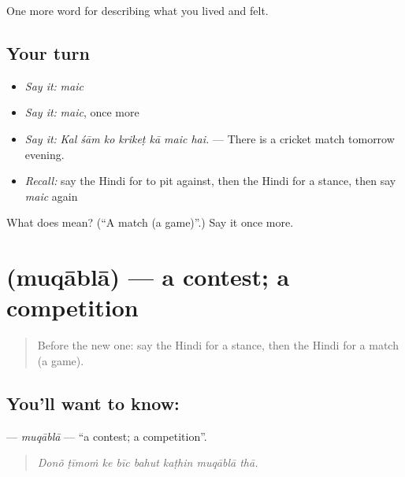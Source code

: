 \begin{grammarlens}[title={What you've built}]
One more word for describing what you lived and felt.
\end{grammarlens}

\subsection*{Your turn}
\begin{itemize}
\raggedright
  \item \emph{Say it:} \emph{maic}
  \item \emph{Say it:} \emph{maic}, once more
  \item \emph{Say it:} \emph{Kal śām ko krikeṭ kā maic hai.} — There is a cricket match tomorrow evening.
  \item \emph{Recall:} say the Hindi for to pit against, then the Hindi for a stance, then say \emph{maic} again
\end{itemize}

\begin{tcolorbox}[breakable,colback=teal!4,colframe=teal!35!black,title={Before you move on}]
What does  mean? (\textquotedblleft{}A match (a game)\textquotedblright{}.) Say it once more.
\end{tcolorbox}
\section[\texorpdfstring{\hi{मुक़ाबला} (muqāblā)}{मुक़ाबला (muqāblā)}]{ (muqāblā) — a contest; a competition}

\label{lesson:HI-C534-muqabla}



\begin{quote}
Before the new one: say the Hindi for a stance, then the Hindi for a match (a game).
\end{quote}

\subsection*{You'll want to know: }
\textbf{} — \emph{muqāblā} — \textquotedblleft{}a contest; a competition\textquotedblright{}.

\begin{quote}
       
\end{quote}

\begin{quote}
\emph{Donõ ṭīmoṁ ke bīc bahut kaṭhin muqāblā thā.}
\end{quote}

